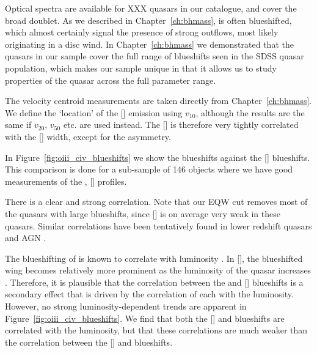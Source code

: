 Optical spectra are available for XXX quasars in our catalogue, and cover the broad  doublet. 
As we described in Chapter~\ref{ch:bhmass},  is often blueshifted, which almost certainly signal the presence of strong outflows, most likely originating in a disc wind.
In Chapter~\ref{ch:bhmass} we demonstrated that the quasars in our sample cover the full range of  blueshifts seen in the \ac{SDSS} quasar population, which makes our sample unique in that it allows us to study properties of the quasar across the full parameter range. 

The  velocity centroid measurements are taken directly from Chapter~\ref{ch:bhmass}. 
We define the `location' of the [] emission using $v_{10}$, although the results are the same if $v_{20}$, $v_{50}$ etc. are used instead.
The [] is therefore very tightly correlated with the [] width, except for the asymmetry. 

In Figure~\ref{fig:oiii_civ_blueshifts} we show the  blueshifts against the [] blueshifts.
This comparison is done for a sub-sample of 146 objects where we have good measurements of the , [] profiles. 

There is a clear and strong correlation. 
Note that our EQW cut removes most of the quasars with large  blueshifts, since [] is on average very weak in these quasars. 
Similar correlations have been tentatively found in lower redshift quasars and \ac{AGN} \citep{zamanov02}. 

The blueshifting of  is known to correlate with luminosity \citep{richards11}.
In [], the blueshifted wing becomes relatively more prominent as the luminosity of the quasar increases \citep{shen14}. 
Therefore, it is plausible that the correlation between the  and [] blueshifts is a secondary effect that is driven by the correlation of each with the luminosity. 
However, no strong luminosity-dependent trends are apparent in Figure~\ref{fig:oiii_civ_blueshifts}. 
We find that both the [] and  blueshifts are correlated with the luminosity, but that these correlations are much weaker than the correlation between the [] and  blueshifts. 



